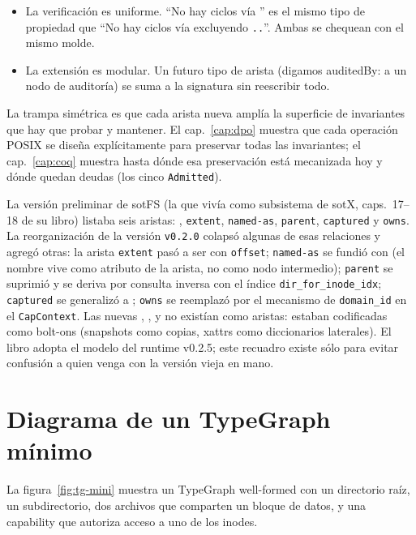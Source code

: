 \begin{itemize}
  \item La verificación es uniforme. ``\textsf{No hay ciclos vía
    \edelegates}'' es el mismo tipo de propiedad que ``\textsf{No hay
    ciclos vía \econtains{} excluyendo \texttt{..}}''. Ambas se chequean
    con el mismo molde.
  \item La extensión es modular. Un futuro tipo de arista
    (digamos \textsf{auditedBy}: \NInode{} a un nodo de auditoría) se
    suma a la signatura sin reescribir todo.
\end{itemize}

La trampa simétrica es que cada arista nueva amplía la superficie de
invariantes que hay que probar y mantener. El cap.~\ref{cap:dpo} muestra
que cada operación POSIX se diseña explícitamente para preservar todas
las invariantes; el cap.~\ref{cap:coq} muestra hasta dónde esa
preservación está mecanizada hoy y dónde quedan deudas (los cinco
\texttt{Admitted}).

\begin{observacion}
\label{obs:evolucion-aristas}
La versión preliminar de sotFS (la que vivía como subsistema de sotX,
caps.\ 17--18 de su libro) listaba seis aristas:
\econtains, \texttt{extent}, \texttt{named-as}, \texttt{parent},
\texttt{captured} y \texttt{owns}. La reorganización de la versión
\texttt{v0.2.0} colapsó algunas de esas relaciones y agregó otras: la
arista \texttt{extent} pasó a ser \epointsto{} con \texttt{offset};
\texttt{named-as} se fundió con \econtains{} (el nombre vive como
atributo de la arista, no como nodo intermedio); \texttt{parent} se
suprimió y se deriva por consulta inversa con el índice
\texttt{dir\_for\_inode\_idx}; \texttt{captured} se generalizó a
\egrants; \texttt{owns} se reemplazó por el mecanismo de \texttt{domain\_id}
en el \texttt{CapContext}. Las nuevas \edelegates, \ederivedfrom,
\esupersedes{} y \ehasxattr{} no existían como aristas: estaban
codificadas como bolt-ons (snapshots como copias, xattrs como
diccionarios laterales). El libro adopta el modelo del runtime
v0.2.5; este recuadro existe sólo para evitar confusión a quien venga
con la versión vieja en mano.
\end{observacion}

\section{Diagrama de un TypeGraph mínimo}

La figura~\ref{fig:tg-mini} muestra un TypeGraph well-formed con un
directorio raíz, un subdirectorio, dos archivos que comparten un bloque
de datos, y una capability que autoriza acceso a uno de los inodes.

